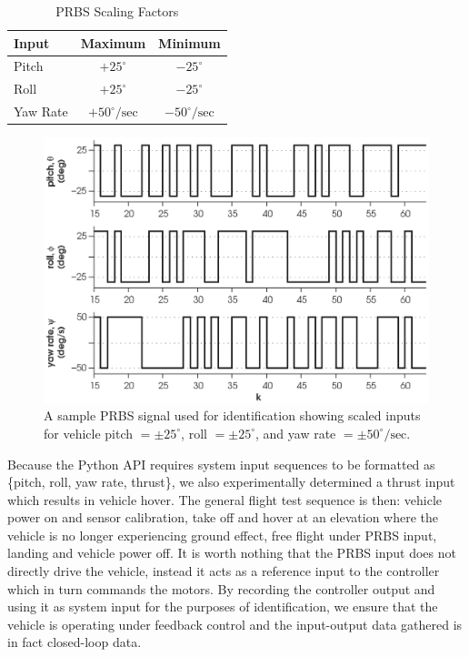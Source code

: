 \begin{table}[!htb]
\centering
\caption{PRBS Scaling Factors}\vspace{1em}
\begin{tabular}{lcc}
\toprule
Input & Maximum & Minimum\\
\midrule
Pitch & $+25^\circ$ & $-25^\circ$\\
Roll & $+25^\circ$ & $-25^\circ$\\
Yaw Rate & $+50^\circ/\mbox{sec}$ & $-50^\circ/\mbox{sec}$\\
\bottomrule
\end{tabular}
\end{table}

\begin{figure}[htb!]
	\centering
	\includegraphics{../fig/test_prbs.eps}
	\caption[A sample PRBS signal used for identification showing scaled inputs for vehicle pitch, roll, and yaw rate.]{A sample PRBS signal used for identification showing scaled inputs for vehicle pitch $= \pm 25^\circ$, roll $= \pm 25^\circ$, and yaw rate $= \pm 50^\circ/\mbox{sec}$.}
\end{figure}

Because the Python API requires system input sequences to be formatted as \{pitch, roll, yaw rate, thrust\}, we also experimentally determined a thrust input which results in vehicle hover. The general flight test sequence is then: vehicle power on and sensor calibration, take off and hover at an elevation where the vehicle is no longer experiencing ground effect, free flight under PRBS input, landing and vehicle power off. It is worth nothing that the PRBS input does not directly drive the vehicle, instead it acts as a reference input to the controller which in turn commands the motors. By recording the controller output and using it as system input for the purposes of identification, we ensure that the vehicle is operating under feedback control and the input-output data gathered is in fact closed-loop data.

